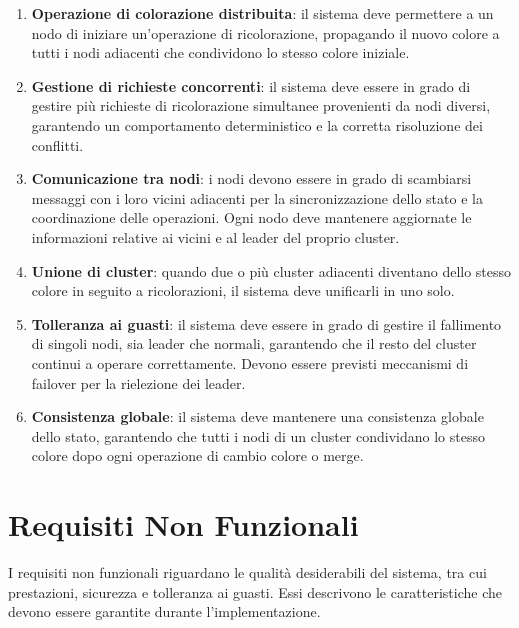 \documentclass[12pt, a4paper]{report}
\begin{document}
\begin{enumerate}
    \item \textbf{Operazione di colorazione distribuita}: il sistema deve permettere a un nodo di iniziare un'operazione di ricolorazione, propagando il nuovo colore a tutti i nodi adiacenti che condividono lo stesso colore iniziale.

    \item \textbf{Gestione di richieste concorrenti}: il sistema deve essere in grado di gestire pi\`u richieste di ricolorazione simultanee provenienti da nodi diversi, garantendo un comportamento deterministico e la corretta risoluzione dei conflitti.

    \item \textbf{Comunicazione tra nodi}: i nodi devono essere in grado di scambiarsi messaggi con i loro vicini adiacenti per la sincronizzazione dello stato e la coordinazione delle operazioni. Ogni nodo deve mantenere aggiornate le informazioni relative ai vicini e al leader del proprio cluster.

    \item \textbf{Unione di cluster}: quando due o pi\`u cluster adiacenti diventano dello stesso colore in seguito a ricolorazioni, il sistema deve unificarli in uno solo.

    \item \textbf{Tolleranza ai guasti}: il sistema deve essere in grado di gestire il fallimento di singoli nodi, sia leader che normali, garantendo che il resto del cluster continui a operare correttamente. Devono essere previsti meccanismi di failover per la rielezione dei leader.

    \item \textbf{Consistenza globale}: il sistema deve mantenere una consistenza globale dello stato, garantendo che tutti i nodi di un cluster condividano lo stesso colore dopo ogni operazione di cambio colore o merge.
\end{enumerate}

\newpage
\section{Requisiti Non Funzionali}

I requisiti non funzionali riguardano le qualit\`a desiderabili del sistema, tra cui prestazioni, sicurezza e tolleranza ai guasti. Essi descrivono le caratteristiche che devono essere garantite durante l'implementazione.
\end{document}
